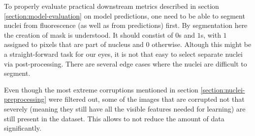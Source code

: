 
To properly evaluate practical downstream metrics described in section \ref{section:model-evaluation} on model predictions, one need to be able to segment nuclei from fluorescence (as well as from predictions) first. By segmentation here the creation of mask is understood. It should constist of $0$s and $1$s, with $1$ assigned to pixels that are part of nucleus and $0$ otherwise. Altough this might be a straight-forward task for our eyes, it is not that easy to select separate nuclei via post-processing. There are several edge cases where the nuclei are difficult to segment.

Even though the most extreme corruptions mentioned in section \ref{section:nuclei-preprocessing} were filtered out, some of the images that are corrupted not that severely (meaning they still have all the visible features needed for learning) are still present in the dataset. This allows to not reduce the amount of data  significantly.
